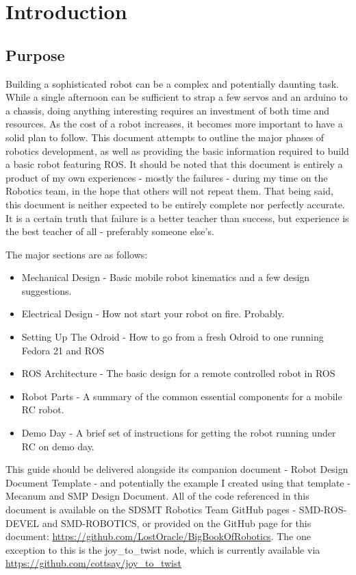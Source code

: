 
\chapter{Introduction}
\label{chap:intro}

\section{Purpose}
Building a sophisticated robot can be a complex and potentially daunting task. While a single afternoon can be sufficient to strap a few servos and an arduino to a chassis, doing anything interesting requires an investment of both time and resources. As the cost of a robot increases, it becomes more important to have a solid plan to follow. This document attempts to outline the major phases of robotics development, as well as providing the basic information required to build a basic robot featuring ROS. It should be noted that this document is entirely a product of my own experiences - mostly the failures - during my time on the Robotics team, in the hope that others will not repeat them. That being said, this document is neither expected to be entirely complete nor perfectly accurate. It is a certain truth that failure is a better teacher than success, but experience is the best teacher of all - preferably someone else's.

The major sections are as follows:
\begin{itemize}
\item{Mechanical Design - Basic mobile robot kinematics and a few design suggestions.}
\item{Electrical Design - How not start your robot on fire. Probably.}
\item{Setting Up The Odroid - How to go from a fresh Odroid to one running Fedora 21 and ROS}
\item{ROS Architecture - The basic design for a remote controlled robot in ROS}
\item{Robot Parts - A summary of the common essential components for a mobile RC robot.}
\item{Demo Day - A brief set of instructions for getting the robot running under RC on demo day.}
\end{itemize} 

This guide should be delivered alongside its companion document - Robot Design Document Template - and potentially the example I created using that template - Mecanum and SMP Design Document. All of the code referenced in this document is available on the SDSMT Robotics Team GitHub pages - SMD-ROS-DEVEL and SMD-ROBOTICS, or provided on the GitHub page for this document: \url{https://github.com/LostOracle/BigBookOfRobotics}. The one exception to this is the joy\_to\_twist node, which is currently available via \url{https://github.com/cottsay/joy_to_twist} \\